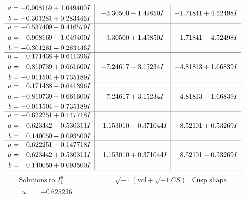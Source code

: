\documentclass[1p]{elsarticle_modified}
\theoremstyle{definition}
\newcommand{\I}{\sqrt{-1}}
\begin{document}
$$\begin{array}{c|c|c}
\begin{aligned}
a &= -0.908169 + 1.049400 I \\
b &= -0.301281 + 0.283446 I\end{aligned}
 & -3.30500 - 1.49850 I & -1.71841 + 4.52498 I \\ \hline\begin{aligned}
u &= -0.537409 - 0.416579 I \\
a &= -0.908169 - 1.049400 I \\
b &= -0.301281 - 0.283446 I\end{aligned}
 & -3.30500 + 1.49850 I & -1.71841 - 4.52498 I \\ \hline\begin{aligned}
u &= \phantom{-}0.171438 + 0.641396 I \\
a &= -0.810739 + 0.661600 I \\
b &= -0.011504 + 0.735189 I\end{aligned}
 & -7.24617 - 3.15234 I & -4.81813 + 1.66839 I \\ \hline\begin{aligned}
u &= \phantom{-}0.171438 - 0.641396 I \\
a &= -0.810739 - 0.661600 I \\
b &= -0.011504 - 0.735189 I\end{aligned}
 & -7.24617 + 3.15234 I & -4.81813 - 1.66839 I \\ \hline\begin{aligned}
u &= -0.622251 + 0.147718 I \\
a &= \phantom{-}0.623442 - 0.530311 I \\
b &= \phantom{-}0.140050 - 0.093500 I\end{aligned}
 & \phantom{-}1.153010 - 0.371044 I & \phantom{-}8.52101 + 0.53269 I \\ \hline\begin{aligned}
u &= -0.622251 - 0.147718 I \\
a &= \phantom{-}0.623442 + 0.530311 I \\
b &= \phantom{-}0.140050 + 0.093500 I\end{aligned}
 & \phantom{-}1.153010 + 0.371044 I & \phantom{-}8.52101 - 0.53269 I\\
 \hline 
 \end{array}$$\newpage$$\begin{array}{c|c|c}  
\text{Solutions to }I^u_{1}& \I (\text{vol} + \sqrt{-1}CS) & \text{Cusp shape}\\
 \hline 
\begin{aligned}
u &= -0.625236\phantom{ +0.000000I} \\

\end{aligned}
\end{array}$$
\end{document}
